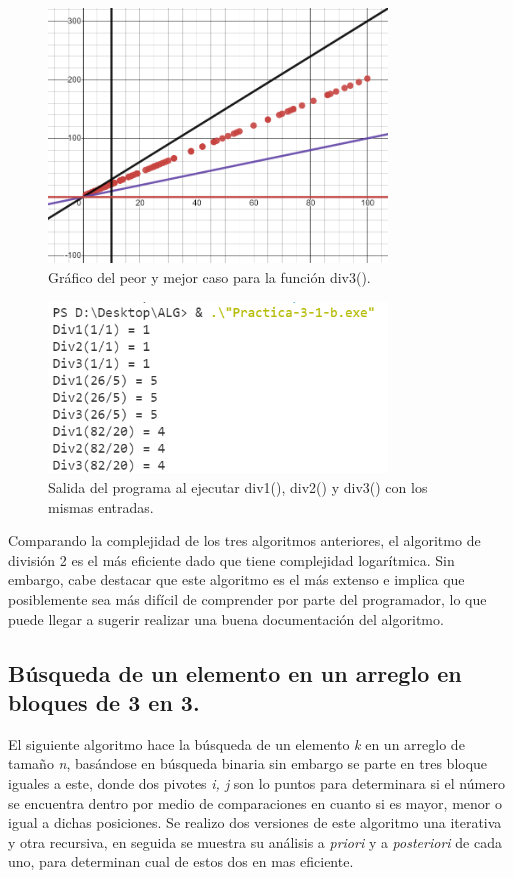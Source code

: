 \documentclass[12pt,twoside]{article}
\begin{document}
                \begin{figure}[H]
                    \centering
                    \includegraphics[width=9cm]{imagenes/div3.png}
                    \caption{Gráfico del peor y mejor caso para la función div3().}
                \end{figure}
                
                \begin{figure}[H]
                    \centering
                    \includegraphics[width=9cm]{imagenes/div_result.png}
                    \caption{Salida del programa al ejecutar div1(), div2() y div3() con los mismas entradas.}
                \end{figure}
                
                Comparando la complejidad de los tres algoritmos anteriores, el algoritmo de división 2 es el más eficiente dado que tiene complejidad logarítmica. Sin embargo, cabe destacar que este algoritmo es el más extenso e implica que posiblemente sea más difícil de comprender por parte del programador, lo que puede llegar a sugerir realizar una buena documentación del algoritmo.
                
        \subsection{B\'usqueda de un elemento en un arreglo en bloques de 3 en 3.}
            El siguiente algoritmo hace la b\'usqueda de un elemento {\it k} en un arreglo de tama\~no {\it n}, bas\'andose en b\'usqueda binaria sin embargo se parte en tres bloque iguales a este, donde dos pivotes {\it i, j} son lo puntos para determinara si el n\'umero se encuentra dentro por medio de comparaciones en cuanto si es mayor, menor o igual a dichas posiciones. Se realizo dos versiones de este algoritmo una iterativa y otra recursiva, en seguida se muestra su an\'alisis a {\it priori} y a {\it posteriori} de cada uno, para determinan cual de estos dos en mas eficiente.  
\end{document}
